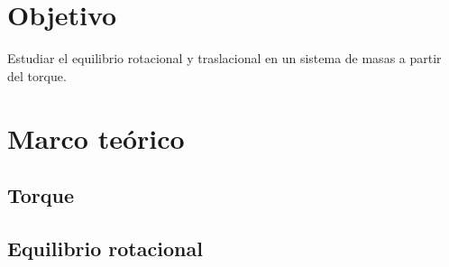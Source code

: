 \documentclass{article}
\begin{document}




\section*{Objetivo}
Estudiar el equilibrio rotacional y traslacional en un sistema de masas a partir del torque.

\section*{Marco teórico}
\subsection{Torque}
\cite{Sears}
\cite{Serway}
\subsection{Equilibrio rotacional}
\end{document}
